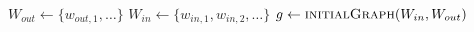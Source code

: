 \documentclass{article}
\begin{document}
\begin{algorithm}
\begin{algorithmic}[1]
\State $W_{out}\gets\{w_{out,1},\dots\}$
\State $W_{in}\gets\{w_{in,1},w_{in,2},\dots\}$
\State $g \gets\Call{initialGraph}{W_{in},W_{out}}$
\end{algorithmic}
\end{algorithm}
\end{document}
